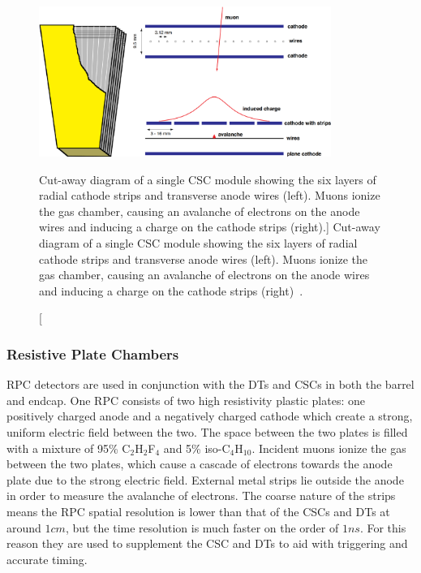 \begin{figure}[htpb]
	\centering
	\includegraphics[width=0.85\textwidth]{figs/03_experiment/cms_csc.pdf}
	\caption
	[Cut-away diagram of a single CSC module showing the six layers of radial cathode strips and transverse anode wires (left). Muons ionize the gas chamber, causing an avalanche of electrons on the anode wires and inducing a charge on the cathode strips (right).]
	{Cut-away diagram of a single CSC module showing the six layers of radial cathode strips and transverse anode wires (left). Muons ionize the gas chamber, causing an avalanche of electrons on the anode wires and inducing a charge on the cathode strips (right)~\cite{DeBruyn:2797803}.}
	\label{fig:CSC}
\end{figure}

\subsubsection{Resistive Plate Chambers} \label{sec:CMS_RPC}
RPC detectors are used in conjunction with the DTs and CSCs in both the barrel and endcap. One RPC consists of two high resistivity plastic plates: one positively charged anode and a negatively charged cathode which create a strong, uniform electric field between the two. The space between the two plates is filled with a mixture of 95\% C$_2$H$_2$F$_4$ and 5\% iso-C$_4$H$_{10}$. Incident muons ionize the gas between the two plates, which cause a cascade of electrons towards the anode plate due to the strong electric field. External metal strips lie outside the anode in order to measure the avalanche of electrons. The coarse nature of the strips means the RPC spatial resolution is lower than that of the CSCs and DTs at around $1\unit{cm}$, but the time resolution is much faster on the order of $1\unit{ns}$. For this reason they are used to supplement the CSC and DTs to aid with triggering and accurate timing.

